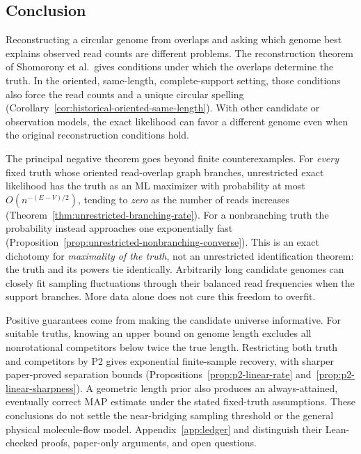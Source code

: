 \subsection{Conclusion}

Reconstructing a circular genome from overlaps and asking which
genome best explains observed read counts are different problems.
The reconstruction theorem of Shomorony et al.\ gives conditions
under which the overlaps determine the truth. In the oriented,
same-length, complete-support setting, those conditions also
force the read counts and a unique circular spelling
(Corollary~\ref{cor:historical-oriented-same-length}).
With other candidate or observation models,
the exact likelihood can favor a different genome even when
the original reconstruction conditions hold.

The principal negative theorem goes beyond finite
counterexamples. For \emph{every} fixed truth whose oriented
read-overlap graph branches, unrestricted exact likelihood
has the truth as an ML maximizer with probability at most
$O(n^{-(E-V)/2})$, tending to \emph{zero} as the number of reads
increases (Theorem~\ref{thm:unrestricted-branching-rate}).
For a nonbranching truth the probability instead approaches one
exponentially fast (Proposition~\ref{prop:unrestricted-nonbranching-converse}).
This is an exact dichotomy for \emph{maximality of the truth},
not an unrestricted identification theorem: the truth and its
powers tie identically. Arbitrarily long candidate genomes
can closely fit sampling fluctuations through their balanced
read frequencies when the support branches.
More data alone does not cure this freedom to overfit.

Positive guarantees come from making the candidate universe
informative. For suitable truths, knowing an upper bound on
genome length excludes all nonrotational competitors below twice
the true length. Restricting both truth and competitors by P2
gives exponential finite-sample recovery, with
sharper paper-proved separation bounds
(Propositions~\ref{prop:p2-linear-rate}
and~\ref{prop:p2-linear-sharpness}).
A geometric length prior also produces an
always-attained, eventually correct MAP estimate
under the stated fixed-truth assumptions.
These conclusions do not settle the near-bridging
sampling threshold or the general physical molecule-flow
model. Appendix~\ref{app:ledger} and
 distinguish their
Lean-checked proofs, paper-only arguments, and open questions.
